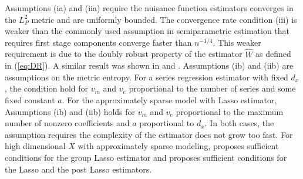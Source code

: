 \documentclass[12pt,oneside,reqno,english]{amsart}
\theoremstyle{definition}
\begin{document}
Assumptions (ia) and (iia) require the nuisance function estimators converges in 
the $L^{2}_{P}$ metric and are uniformly bounded. 
The convergence rate condition (iii) is weaker than the commonly used assumption in semiparametric estimation
that requires first stage components converge faster than $n^{-1/4}$. 
This weaker requirement is due to the doubly robust property of the estimator $\hat{W}$ as defined in (\ref{eq:DR}). 
A similar result was shown in \cite{RF:18} and  \cite{Farrell:15}. 
Assumptions (ib) and (iib) are assumptions on the metric entropy. 
For a series regression estimator with fixed $d_{x}$, the condition hold for $v_{m}$ and $v_{e}$ proportional to the number of series and some fixed constant $a$. 
For the approximately sparse model with Lasso estimator, Assumptions (ib) and (iib) holds for $v_{m}$ and $v_{e}$ proportional to the maximum number of nonzero coefficients and $a$ proportional to $d_{x}$. In both cases, the assumption requires the complexity of the estimator does not grow too fast. 
For high dimensional $X$ with approximately sparse modeling,  
 \cite{Farrell:15} proposes sufficient conditions for the group Lasso estimator
 and \cite{BCFH:17} proposes sufficient conditions for the Lasso and the post Lasso estimators. 
 
\end{document}
